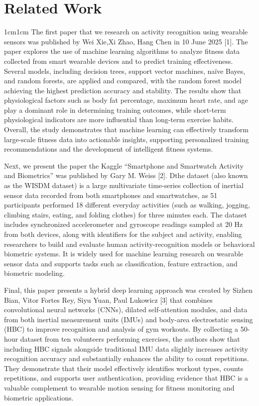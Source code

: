 \documentclass[11pt,a4paper]{article}
\begin{document}
\section{Related Work}
\begin{adjustwidth}{1cm}{1cm}
The first paper that we research on activity recognition using wearable sensors was published by Wei Xie,Xi Zhao, Hang Chen in 10 June 2025 [1]. The paper explores the use of machine learning algorithms to analyze fitness data collected from smart wearable devices and to predict training effectiveness. Several models, including decision trees, support vector machines, naïve Bayes, and random forests, are applied and compared, with the random forest model achieving the highest prediction accuracy and stability. The results show that physiological factors such as body fat percentage, maximum heart rate, and age play a dominant role in determining training outcomes, while short-term physiological indicators are more influential than long-term exercise habits. Overall, the study demonstrates that machine learning can effectively transform large-scale fitness data into actionable insights, supporting personalized training recommendations and the development of intelligent fitness systems.

Next, we present the paper the Kaggle “Smartphone and Smartwatch Activity and Biometrics” was published by Gary M. Weiss [2]. Dthe dataset (also known as the WISDM dataset) is a large multivariate time-series collection of inertial sensor data recorded from both smartphones and smartwatches, as 51 participants performed 18 different everyday activities (such as walking, jogging, climbing stairs, eating, and folding clothes) for three minutes each. The dataset includes synchronized accelerometer and gyroscope readings sampled at 20 Hz from both devices, along with identifiers for the subject and activity, enabling researchers to build and evaluate human activity-recognition models or behavioral biometric systems. It is widely used for machine learning research on wearable sensor data and supports tasks such as classification, feature extraction, and biometric modeling.

Final, this paper presents a hybrid deep learning approach was created by Sizhen Bian, Vitor Fortes Rey, Siyu Yuan, Paul Lukowicz [3] that combines convolutional neural networks (CNNs), dilated self-attention modules, and data from both inertial measurement units (IMUs) and body-area electrostatic sensing (HBC) to improve recognition and analysis of gym workouts. By collecting a 50-hour dataset from ten volunteers performing exercises, the authors show that including HBC signals alongside traditional IMU data slightly increases activity recognition accuracy and substantially enhances the ability to count repetitions. They demonstrate that their model effectively identifies workout types, counts repetitions, and supports user authentication, providing evidence that HBC is a valuable complement to wearable motion sensing for fitness monitoring and biometric applications.
\end{adjustwidth}
\end{document}
